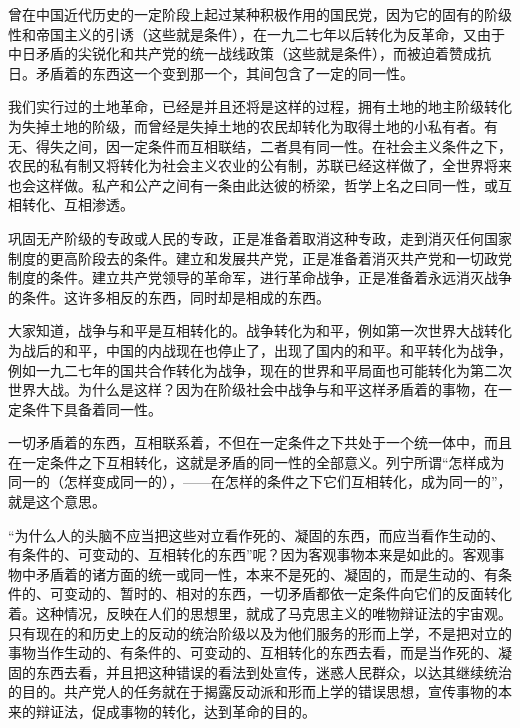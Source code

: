 \documentclass[UTF8, 12pt, a4paper]{ctexrep}
\begin{document}
曾在中国近代历史的一定阶段上起过某种积极作用的国民党，因为它的固有的阶级性和帝国主义的引诱（这些就是条件），在一九二七年以后转化为反革命，又由于中日矛盾的尖锐化和共产党的统一战线政策（这些就是条件），而被迫着赞成抗日。矛盾着的东西这一个变到那一个，其间包含了一定的同一性。

我们实行过的土地革命，已经是并且还将是这样的过程，拥有土地的地主阶级转化为失掉土地的阶级，而曾经是失掉土地的农民却转化为取得土地的小私有者。有无、得失之间，因一定条件而互相联结，二者具有同一性。在社会主义条件之下，农民的私有制又将转化为社会主义农业的公有制，苏联已经这样做了，全世界将来也会这样做。私产和公产之间有一条由此达彼的桥梁，哲学上名之曰同一性，或互相转化、互相渗透。

巩固无产阶级的专政或人民的专政，正是准备着取消这种专政，走到消灭任何国家制度的更高阶段去的条件。建立和发展共产党，正是准备着消灭共产党和一切政党制度的条件。建立共产党领导的革命军，进行革命战争，正是准备着永远消灭战争的条件。这许多相反的东西，同时却是相成的东西。

大家知道，战争与和平是互相转化的。战争转化为和平，例如第一次世界大战转化为战后的和平，中国的内战现在也停止了，出现了国内的和平。和平转化为战争，例如一九二七年的国共合作转化为战争，现在的世界和平局面也可能转化为第二次世界大战。为什么是这样？因为在阶级社会中战争与和平这样矛盾着的事物，在一定条件下具备着同一性。

一切矛盾着的东西，互相联系着，不但在一定条件之下共处于一个统一体中，而且在一定条件之下互相转化，这就是矛盾的同一性的全部意义。列宁所谓“怎样成为同一的（怎样变成同一的），——在怎样的条件之下它们互相转化，成为同一的”，就是这个意思。

“为什么人的头脑不应当把这些对立看作死的、凝固的东西，而应当看作生动的、有条件的、可变动的、互相转化的东西”呢？因为客观事物本来是如此的。客观事物中矛盾着的诸方面的统一或同一性，本来不是死的、凝固的，而是生动的、有条件的、可变动的、暂时的、相对的东西，一切矛盾都依一定条件向它们的反面转化着。这种情况，反映在人们的思想里，就成了马克思主义的唯物辩证法的宇宙观。只有现在的和历史上的反动的统治阶级以及为他们服务的形而上学，不是把对立的事物当作生动的、有条件的、可变动的、互相转化的东西去看，而是当作死的、凝固的东西去看，并且把这种错误的看法到处宣传，迷惑人民群众，以达其继续统治的目的。共产党人的任务就在于揭露反动派和形而上学的错误思想，宣传事物的本来的辩证法，促成事物的转化，达到革命的目的。
\end{document}
